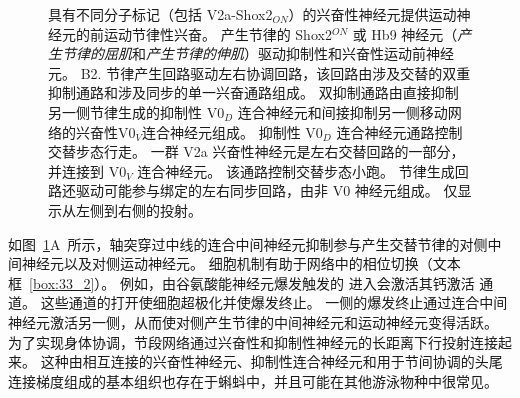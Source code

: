 \begin{figure}[htbp]
{	具有不同分子标记（包括 V2a-Shox2$_{ON}$）的兴奋性神经元提供运动神经元的前运动节律性兴奋。
	产生节律的 Shox2$ ^{ON} $ 或 Hb9 神经元（\textit{产生节律的屈肌}和\textit{产生节律的伸肌}）驱动抑制性和兴奋性运动前神经元\cite{kiehn2016decoding}。
	B2. 节律产生回路驱动左右协调回路，该回路由涉及交替的双重抑制通路和涉及同步的单一兴奋通路组成。
	双抑制通路由直接抑制另一侧节律生成的抑制性 V0$_D$ 连合神经元和间接抑制另一侧移动网络的兴奋性V0$_V$连合神经元组成。
	抑制性 V0$_D$ 连合神经元通路控制交替步态行走。
	一群 V2a 兴奋性神经元是左右交替回路的一部分，并连接到 V0$_V$ 连合神经元。
	该通路控制交替步态小跑。
	节律生成回路还驱动可能参与绑定的左右同步回路，由非 V0 神经元组成。
	仅显示从左侧到右侧的投射\cite{kiehn2016decoding}。}
	\label{fig:33_7}
\end{figure}


如图~\ref{fig:33_7}A~所示，轴突穿过中线的连合中间神经元抑制参与产生交替节律的对侧中间神经元以及对侧运动神经元。
细胞机制有助于网络中的相位切换（文本框~\ref{box:33_2}）。
例如，由谷氨酸能神经元爆发触发的  进入会激活其钙激活  通道。
这些通道的打开使细胞超极化并使爆发终止。
一侧的爆发终止通过连合中间神经元激活另一侧，从而使对侧产生节律的中间神经元和运动神经元变得活跃。
为了实现身体协调，节段网络通过兴奋性和抑制性神经元的长距离下行投射连接起来。
这种由相互连接的兴奋性神经元、抑制性连合神经元和用于节间协调的头尾连接梯度组成的基本组织也存在于蝌蚪中，并且可能在其他游泳物种中很常见。


